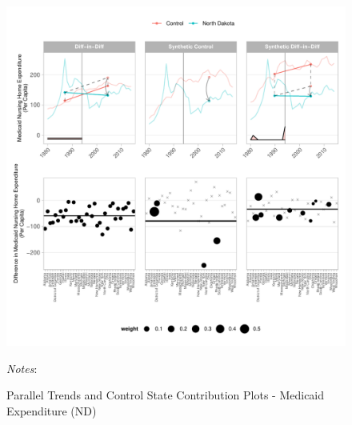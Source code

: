 \documentclass[12pt]{article}
\begin{document}
\newpage
\begin{figure}[t]
	\begin{center}
	\caption{\centering Parallel Trends and Control State Contribution Plots - Medicaid Expenditure (ND)}
    \includegraphics[width=\textwidth,keepaspectratio]{medicaid_expenditure_plots_ND.pdf}
    \end{center}
    \footnotesize
		\textit{Notes}:
\end{figure}
\clearpage

\newpage



\clearpage
\end{document}
